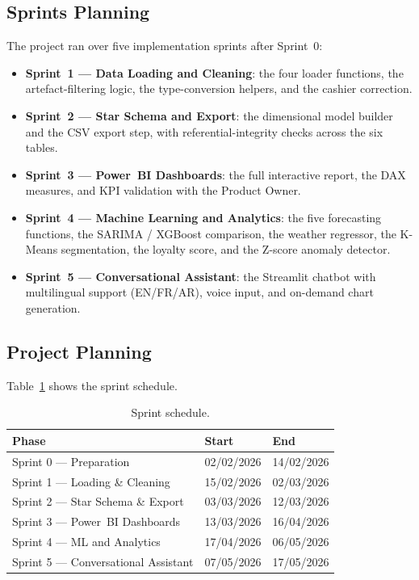 \documentclass[12pt, a4paper]{report}
\begin{document}
\subsection{Sprints Planning}

The project ran over five implementation sprints after Sprint~0:

\begin{itemize}
  \item \textbf{Sprint~1 — Data Loading and Cleaning}: the four loader
        functions, the artefact-filtering logic, the type-conversion helpers,
        and the cashier correction.
  \item \textbf{Sprint~2 — Star Schema and Export}: the dimensional model
        builder and the CSV export step, with referential-integrity checks
        across the six tables.
  \item \textbf{Sprint~3 — Power~BI Dashboards}: the full interactive report,
        the DAX measures, and KPI validation with the Product Owner.
  \item \textbf{Sprint~4 — Machine Learning and Analytics}: the five
        forecasting functions, the SARIMA / XGBoost comparison, the weather
        regressor, the K-Means segmentation, the loyalty score, and the
        Z-score anomaly detector.
  \item \textbf{Sprint~5 — Conversational Assistant}: the Streamlit chatbot
        with multilingual support (EN/FR/AR), voice input, and on-demand
        chart generation.
\end{itemize}

\subsection{Project Planning}

Table~\ref{tab:planning} shows the sprint schedule.

\begin{table}[H]
  \centering
  \caption{Sprint schedule.\label{tab:planning}}
  \begin{tabular}{lll}
    \toprule
    \textbf{Phase}  & \textbf{Start} & \textbf{End} \\
    \midrule
    Sprint 0 — Preparation                  & 02/02/2026 & 14/02/2026 \\
    Sprint 1 — Loading \& Cleaning          & 15/02/2026 & 02/03/2026 \\
    Sprint 2 — Star Schema \& Export        & 03/03/2026 & 12/03/2026 \\
    Sprint 3 — Power~BI Dashboards          & 13/03/2026 & 16/04/2026 \\
    Sprint 4 — ML and Analytics             & 17/04/2026 & 06/05/2026 \\
    Sprint 5 — Conversational Assistant     & 07/05/2026 & 17/05/2026 \\
    \bottomrule
  \end{tabular}
\end{table}
\end{document}
